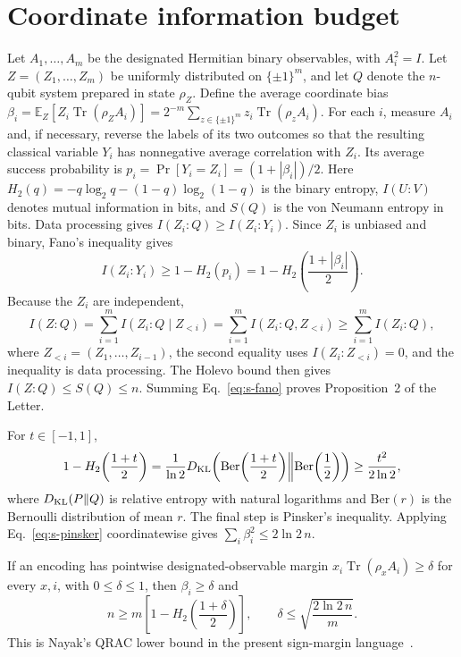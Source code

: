 \documentclass[10pt,aps,pra,twocolumn,superscriptaddress,nofootinbib,longbibliography]{revtex4-2}
\newcommand{\Tr}{\operatorname{Tr}}
\begin{document}
{\section{Coordinate information budget}
\label{supp:bias}
Let $A_1,\ldots,A_m$ be the designated Hermitian binary observables, with $A_i^2=I$.  Let $Z=(Z_1,\ldots,Z_m)$ be uniformly distributed on $\{\pm1\}^m$, and let $Q$ denote the $n$-qubit system prepared in state $\rho_Z$.  Define the average coordinate bias $\beta_i=\mathbb E_Z[Z_i\Tr(\rho_ZA_i)]=2^{-m}\sum_{z\in\{\pm1\}^m}z_i\Tr(\rho_zA_i)$.
For each $i$, measure $A_i$ and, if necessary, reverse the labels of its two outcomes so that the resulting classical variable $Y_i$ has nonnegative average correlation with $Z_i$.  Its average success probability is $p_i=\Pr[Y_i=Z_i]=(1+|\beta_i|)/2$.  Here $H_2(q)=-q\log_2 q-(1-q)\log_2(1-q)$ is the binary entropy, $I(U:V)$ denotes mutual information in bits, and $S(Q)$ is the von Neumann entropy in bits.  Data processing gives $I(Z_i:Q)\ge I(Z_i:Y_i)$.  Since $Z_i$ is unbiased and binary, Fano's inequality gives
\begin{equation}
    I(Z_i:Y_i)\ge1-H_2(p_i)
    =1-H_2\!\left(\frac{1+|\beta_i|}{2}\right).
    \label{eq:s-fano}
\end{equation}
Because the $Z_i$ are independent,
\begin{equation}
    I(Z:Q)
    =\sum_{i=1}^{m} I(Z_i:Q\mid Z_{<i}) =\sum_{i=1}^{m} I(Z_i:Q,Z_{<i}) \ge\sum_{i=1}^{m}I(Z_i:Q),
    \label{eq:s-superadditive-info}
\end{equation}
where $Z_{<i}=(Z_1,\ldots,Z_{i-1})$, the second equality uses $I(Z_i:Z_{<i})=0$, and the inequality is data processing.  The Holevo bound then gives $I(Z:Q)\le S(Q)\le n$.  Summing Eq.~\eqref{eq:s-fano} proves Proposition~2 of the Letter.

For $t\in[-1,1]$,
\begin{equation}
    1-H_2\!\left(\frac{1+t}{2}\right)
    =\frac{1}{\ln2}D_{\rm KL}\!\left(\mathrm{Ber}\!\left(\frac{1+t}{2}\right)\middle\|\mathrm{Ber}\!\left(\frac12\right)\right)
    \ge\frac{t^2}{2\ln2},
    \label{eq:s-pinsker}
\end{equation}
where $D_{\rm KL}(P\|Q)$ is relative entropy with natural logarithms and $\mathrm{Ber}(r)$ is the Bernoulli distribution of mean $r$.  The final step is Pinsker's inequality.  Applying Eq.~\eqref{eq:s-pinsker} coordinatewise gives $\sum_i\beta_i^2\le2\ln2\,n$.

If an encoding has pointwise designated-observable margin $x_i\Tr(\rho_xA_i)\ge\delta$ for every $x,i$, with $0\le\delta\le1$, then $\beta_i\ge\delta$ and
\begin{equation}
    n\ge m\left[1-H_2\!\left(\frac{1+\delta}{2}\right)\right],
    \qquad
    \delta\le\sqrt{\frac{2\ln2\,n}{m}}.
    \label{eq:s-generic-bound}
\end{equation}
This is Nayak's QRAC lower bound in the present sign-margin language~\cite{Nayak1999QRAC}.

}
\end{document}
